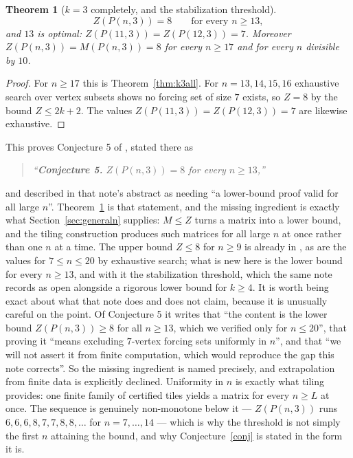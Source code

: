 \documentclass[11pt]{article}
\newtheorem{theorem}{Theorem}
\theoremstyle{definition}
\begin{document}
\begin{theorem}[$k=3$ completely, and the stabilization threshold]
\label{thm:k3krishnan}
\[
  Z(P(n,3))=8\qquad\text{for every } n\ge13,
\]
and $13$ is optimal: $Z(P(11,3))=Z(P(12,3))=7$. Moreover
$Z(P(n,3))=M(P(n,3))=8$ for every $n\ge17$ and for every $n$ divisible by $10$.
\end{theorem}

\begin{proof}
For $n\ge17$ this is Theorem~\ref{thm:k3all}. For $n=13,14,15,16$ exhaustive
search over vertex subsets shows no forcing set of size $7$ exists, so
$Z=8$ by the bound $Z\le2k+2$. The values $Z(P(11,3))=Z(P(12,3))=7$ are
likewise exhaustive.
\end{proof}

\noindent
This proves Conjecture 5 of \cite{K}, stated there as
\begin{quote}\itshape
``\textbf{Conjecture 5.} $Z(P(n,3))=8$ for every $n\ge13$,''
\end{quote}
and described in that note's abstract as needing ``a lower-bound proof valid for
all large $n$''.
Theorem~\ref{thm:k3krishnan} is that statement, and the missing ingredient is
exactly what Section~\ref{sec:generaln} supplies: $M\le Z$ turns a matrix into a
lower bound, and the tiling construction produces such matrices for all large
$n$ at once rather than one $n$ at a time. The upper bound $Z\le8$ for $n\ge9$
is already in \cite{K}, as are the values for $7\le n\le20$ by exhaustive
search; what is new here is the lower bound for every $n\ge13$, and with it the
stabilization threshold, which the same note records as open alongside a
rigorous lower bound for $k\ge4$. It is worth being exact about what that note
does and does not claim, because it is unusually careful on the point. Of
Conjecture 5 it writes that ``the content is the lower bound $Z(P(n,3))\ge8$ for
all $n\ge13$, which we verified only for $n\le20$'', that proving it ``means
excluding $7$-vertex forcing sets uniformly in $n$'', and that ``we will not
assert it from finite computation, which would reproduce the gap this note
corrects''. So the missing ingredient is named precisely, and extrapolation from
finite data is explicitly declined. Uniformity in $n$ is exactly what tiling
provides: one finite family of certified tiles yields a matrix for every
$n\ge L$ at once. The sequence is genuinely non-monotone below it ---
$Z(P(n,3))$ runs $6,6,6,8,7,7,8,8,\dots$ for $n=7,\dots,14$ --- which is why
the threshold is not simply the first $n$ attaining the bound, and why
Conjecture~\ref{conj} is stated in the form it is.
\end{document}
